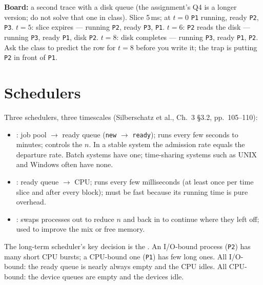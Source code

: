 \documentclass[11pt]{article}
\begin{document}
\textbf{Board:} a second trace with a disk queue (the assignment's Q4 is a longer version; do not solve that one in class). Slice 5\,ms; at $t=0$ \texttt{P1} running, ready \texttt{P2}, \texttt{P3}. $t=5$: slice expires --- running \texttt{P2}, ready \texttt{P3}, \texttt{P1}. $t=6$: \texttt{P2} reads the disk --- running \texttt{P3}, ready \texttt{P1}, disk \texttt{P2}. $t=8$: disk completes --- running \texttt{P3}, ready \texttt{P1}, \texttt{P2}. Ask the class to predict the row for $t=8$ before you write it; the trap is putting \texttt{P2} in front of \texttt{P1}.

\section{Schedulers}

Three schedulers, three timescales (Silberschatz et al., Ch.~3 \S3.2, pp.~105--110):

\begin{itemize}
  \item {}: job pool $\to$ ready queue (\texttt{new} $\to$ \texttt{ready}); runs every few seconds to minutes; controls the  $n$. In a stable system the admission rate equals the departure rate. Batch systems have one; time-sharing systems such as UNIX and Windows often have none.
  \item {}: ready queue $\to$ CPU; runs every few milliseconds (at least once per time slice and after every block); must be fast because its running time is pure overhead.
  \item {}: swaps processes out to reduce $n$ and back in to continue where they left off; used to improve the mix or free memory.
\end{itemize}

The long-term scheduler's key decision is the . An I/O-bound process (\texttt{P2}) has many short CPU bursts; a CPU-bound one (\texttt{P1}) has few long ones. All I/O-bound: the ready queue is nearly always empty and the CPU idles. All CPU-bound: the device queues are empty and the devices idle.
\end{document}
